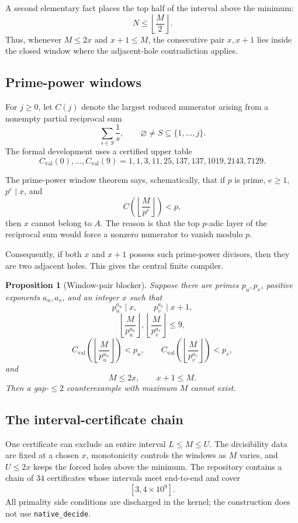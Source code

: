 \documentclass[11pt]{article}
\newtheorem{proposition}[theorem]{Proposition}
\theoremstyle{definition}
\newcommand{\1}{\mathbf 1}
\begin{document}
A second elementary fact places the top half of the interval above the minimum:
\[
N\le\left\lfloor\frac M2\right\rfloor.
\]
Thus, whenever $M\le2x$ and $x+1\le M$, the consecutive pair $x,x+1$ lies inside the
closed window where the adjacent-hole contradiction applies.

\subsection{Prime-power windows}

For $j\ge0$, let $C(j)$ denote the largest reduced numerator arising from a nonempty
partial reciprocal sum
\[
\sum_{s\in S}\frac1s,\qquad \varnothing\ne S\subseteq\{1,\dots,j\}.
\]
The formal development uses a certified upper table
\[
C_{\mathrm{val}}(0),\dots,C_{\mathrm{val}}(9)
=1,1,3,11,25,137,137,1019,2143,7129.
\]

The prime-power window theorem says, schematically, that if $p$ is prime, $e\ge1$,
$p^e\mid x$, and
\[
C\!\left(\left\lfloor\frac M{p^e}\right\rfloor\right)<p,
\]
then $x$ cannot belong to $A$.  The reason is that the top $p$-adic layer of the reciprocal
sum would force a nonzero numerator to vanish modulo $p$.

Consequently, if both $x$ and $x+1$ possess such prime-power divisors, then they are two
adjacent holes.  This gives the central finite compiler.

\begin{proposition}[Window-pair blocker]
Suppose there are primes $p_u,p_v$, positive exponents $a_u,a_v$, and an integer $x$ such
that
\[
p_u^{a_u}\mid x,\qquad p_v^{a_v}\mid x+1,
\]
\[
\left\lfloor\frac M{p_u^{a_u}}\right\rfloor,
\left\lfloor\frac M{p_v^{a_v}}\right\rfloor\le9,
\]
\[
C_{\mathrm{val}}\!\left(\left\lfloor\frac M{p_u^{a_u}}\right\rfloor\right)<p_u,
\qquad
C_{\mathrm{val}}\!\left(\left\lfloor\frac M{p_v^{a_v}}\right\rfloor\right)<p_v,
\]
and
\[
M\le2x,
\qquad x+1\le M.
\]
Then a gap-$\le2$ counterexample with maximum $M$ cannot exist.
\end{proposition}

\subsection{The interval-certificate chain}

One certificate can exclude an entire interval $L\le M\le U$.  The divisibility data are
fixed at a chosen $x$, monotonicity controls the windows as $M$ varies, and $U\le2x$
keeps the forced holes above the minimum.  The repository contains a chain of $34$
certificates whose intervals meet end-to-end and cover
\[
[3,4\times10^9].
\]
All primality side conditions are discharged in the kernel; the construction does not use
\texttt{native\_decide}.
\end{document}
